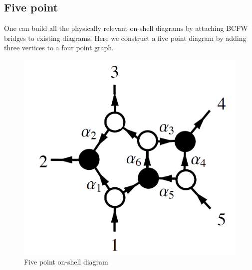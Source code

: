 \documentclass[letter,11pt]{article}
\begin{document}
\subsection{Five point}
One can build all the physically relevant on-shell diagrams by attaching BCFW bridges to existing diagrams. Here we construct a five point diagram by adding three vertices to a four point graph.
\begin{figure}[H]
	\centering
	\includegraphics[width=0.25\linewidth]{5pt}
	\caption{Five point on-shell diagram}
	\label{fig:5pt}
\end{figure}
\end{document}
